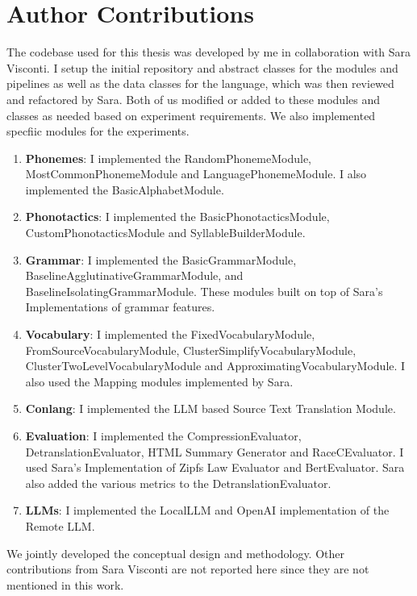 \chapter{Author Contributions}\label{chapter:contributions}
The codebase used for this thesis was developed by me in collaboration with Sara Visconti. I setup the initial repository and abstract classes
for the modules and pipelines as well as the data classes for the language, which was then reviewed and refactored by Sara. Both of us modified
or added to these modules and classes as needed based on experiment requirements. We also implemented specfiic modules for the experiments.

\begin{enumerate}
    \item \textbf{Phonemes}: I implemented the RandomPhonemeModule, MostCommonPhonemeModule and LanguagePhonemeModule. I also implemented the BasicAlphabetModule.
    \item \textbf{Phonotactics}: I implemented the BasicPhonotacticsModule, CustomPhonotacticsModule and SyllableBuilderModule. 
    \item \textbf{Grammar}: I implemented the BasicGrammarModule, BaselineAgglutinativeGrammarModule, and BaselineIsolatingGrammarModule. These modules built on top of Sara's Implementations of grammar features.
    \item \textbf{Vocabulary}: I implemented the FixedVocabularyModule, FromSourceVocabularyModule, ClusterSimplifyVocabularyModule, ClusterTwoLevelVocabularyModule and ApproximatingVocabularyModule. I also used the Mapping modules implemented by Sara.
    \item \textbf{Conlang}: I implemented the LLM based Source Text Translation Module.
    \item \textbf{Evaluation}: I implemented the CompressionEvaluator, DetranslationEvaluator, HTML Summary Generator and RaceCEvaluator. I used Sara's Implementation of Zipfs Law Evaluator and BertEvaluator. Sara also added the various metrics to the DetranslationEvaluator.
    \item \textbf{LLMs}: I implemented the LocalLLM and OpenAI implementation of the Remote LLM.
\end{enumerate}

We jointly developed the conceptual design and methodology. Other contributions from Sara Visconti are not reported here since they are not mentioned in this work.

